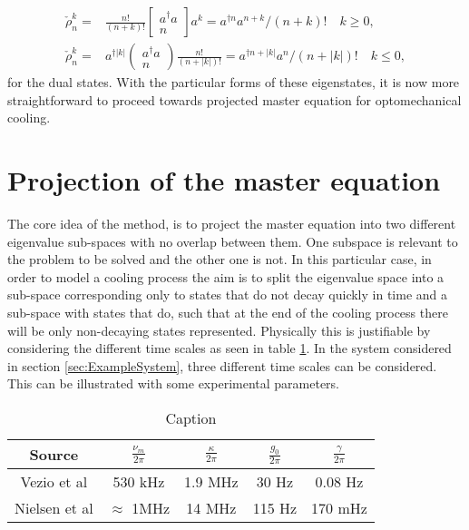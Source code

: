 \documentclass[12pt]{article}
\begin{document}
\begin{align}
    \check{\rho}_n^k =&\nonumber  \frac{n !}{(n+k) !}\left[\begin{array}{c}
a^{\dagger} a \\
n
\end{array}\right] a^{k}=a^{\dagger n} a^{n+k} /(n+k) ! \quad k \geq 0,\\
\check{\rho}_n^k =&\nonumber a^{\dagger|k|}(\begin{array}{c}
a^{\dagger} a \\
n
\end{array}) \frac{n !}{(n+|k|) !}=a^{\dagger n+|k|} a^{n} /(n+|k|) ! \quad k \leq 0,
\end{align} for the dual states. With the particular forms of these eigenstates, it is now more straightforward to proceed towards projected master equation for optomechanical cooling.


\section{Projection of the master equation}

The core idea of the method, is to project the master equation into two different eigenvalue sub-spaces with no overlap between them. One subspace is relevant to the problem to be solved and the other one is not. In this particular case, in order to model a cooling process the aim is to split the eigenvalue space into a sub-space corresponding only to states that do not decay quickly in time and a sub-space with states that do, such that at the end of the cooling process there will be only non-decaying states represented. Physically this is justifiable by considering the different time scales as seen in table \ref{tab:experimental_parameter_table}. In the system considered in section \ref{sec:ExampleSystem}, three different time scales can be considered. This can be illustrated with some experimental parameters.

\begin{table}[]
    \centering
    \begin{tabular}{|c|c|c|c|c|}
        \hline
        Source & $\frac{\nu_m}{2\pi}$ & $\frac{\kappa}{2\pi}$ & $\frac{g_0}{2\pi}$&  $\frac{\gamma}{2\pi}$  \\
        \hline\hline
        Vezio et al \cite{VezioOMExperiment2020} & 530 kHz & 1.9 MHz &  30 Hz & 0.08 Hz \\
        \hline
        Nielsen et al \cite{NielsenMultimodeOptomechanicalMembrane2017} & $\approx$ 1MHz & 14 MHz & 115 Hz & 170 mHz\\
        \hline
    \end{tabular}
    \caption{Caption}
    \label{tab:experimental_parameter_table}
\end{table}
\end{document}
